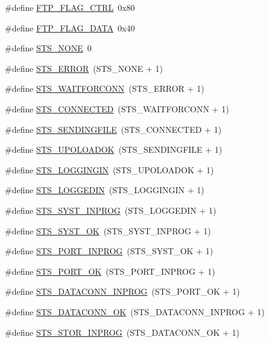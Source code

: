 \begin{DoxyCompactItemize}
\item 
\#define \hyperlink{group__ftp_ga6b402e3086d470f0345f690cda06e37e}{FTP\_\-FLAG\_\-CTRL}~0x80
\item 
\#define \hyperlink{group__ftp_ga929304ba787388ea46cbbd21666ab2b6}{FTP\_\-FLAG\_\-DATA}~0x40
\item 
\#define \hyperlink{group__ftp_ga30b7e26a0e7ce7ac0d823c31b22de694}{STS\_\-NONE}~0
\item 
\#define \hyperlink{group__ftp_gadf48c1088e7b27fa287d1d2e6c941bc3}{STS\_\-ERROR}~(STS\_\-NONE + 1)
\item 
\#define \hyperlink{group__ftp_gae144fc3376441fba0f34150f365d2ea5}{STS\_\-WAITFORCONN}~(STS\_\-ERROR + 1)
\item 
\#define \hyperlink{group__ftp_gae13a7a1a411918b955f9fc4f565e69f1}{STS\_\-CONNECTED}~(STS\_\-WAITFORCONN + 1)
\item 
\#define \hyperlink{group__ftp_ga36c56c6a5468beffe87cf4356794003a}{STS\_\-SENDINGFILE}~(STS\_\-CONNECTED + 1)
\item 
\#define \hyperlink{group__ftp_ga24c39c192e52b089875c082a055176d2}{STS\_\-UPOLOADOK}~(STS\_\-SENDINGFILE + 1)
\item 
\#define \hyperlink{group__ftp_ga4ffd18340d269b7f62cdf58d0de8eda8}{STS\_\-LOGGINGIN}~(STS\_\-UPOLOADOK + 1)
\item 
\#define \hyperlink{group__ftp_gaf68741feccc4b63d819090a11c1d6786}{STS\_\-LOGGEDIN}~(STS\_\-LOGGINGIN + 1)
\item 
\#define \hyperlink{group__ftp_ga722775804a5d9b7284483035d2bd7f60}{STS\_\-SYST\_\-INPROG}~(STS\_\-LOGGEDIN + 1)
\item 
\#define \hyperlink{group__ftp_ga8ad7d921fb5f219e862fea273dd44200}{STS\_\-SYST\_\-OK}~(STS\_\-SYST\_\-INPROG + 1)
\item 
\#define \hyperlink{group__ftp_gac5bed1b6ca25781b6a9f2c0c2a658fe1}{STS\_\-PORT\_\-INPROG}~(STS\_\-SYST\_\-OK + 1)
\item 
\#define \hyperlink{group__ftp_gaface357a7eb03399c1fcdef69e5e3b21}{STS\_\-PORT\_\-OK}~(STS\_\-PORT\_\-INPROG + 1)
\item 
\#define \hyperlink{group__ftp_gaa08b829702c3b69780e270df8aca352c}{STS\_\-DATACONN\_\-INPROG}~(STS\_\-PORT\_\-OK + 1)
\item 
\#define \hyperlink{group__ftp_gab7488a1a393b4e92eb386754bad49fc4}{STS\_\-DATACONN\_\-OK}~(STS\_\-DATACONN\_\-INPROG + 1)
\item 
\#define \hyperlink{group__ftp_ga66de4fa6c61ea9f3b365df7caf0e0dd5}{STS\_\-STOR\_\-INPROG}~(STS\_\-DATACONN\_\-OK + 1)

\end{DoxyCompactItemize}
